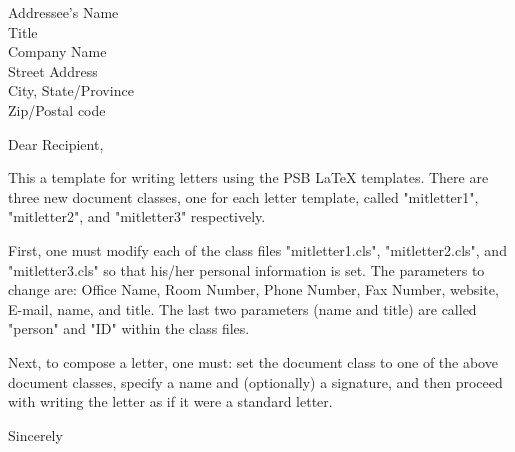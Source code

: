 \documentclass{mitletter2}
\begin{document}
\signature{Your Name\\{\it Your Title}}



\begin{letter}{Addressee's Name\\
Title\\
Company Name\\
Street Address\\
City, State/Province\\
Zip/Postal code}


\opening{Dear Recipient,}
This a template for writing letters using the PSB LaTeX templates.  There
are three new document classes, one for each letter template, called
"mitletter1", "mitletter2", and "mitletter3" respectively.
                                                                                
First, one must modify each of the class files "mitletter1.cls",
"mitletter2.cls", and "mitletter3.cls" so that his/her personal
information is set.  The parameters to change are: Office Name, Room
Number, Phone Number, Fax Number, website, E-mail, name, and title.  The
last two parameters (name and title) are called "person" and "ID" within
the class files.
                                                                                
Next, to compose a letter, one must: set the document class to one of the
above document classes, specify a name and (optionally) a signature, and
then proceed with writing the letter as if it were a standard letter.

\closing{Sincerely}

\end{letter}
\end{document}
